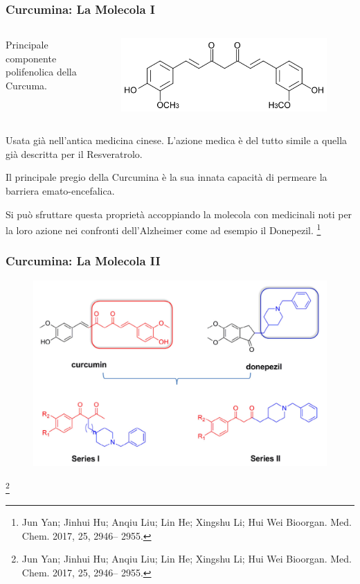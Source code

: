 \documentclass[9pt]{beamer}
\newcommand\blfootnote[1]{%
	\begingroup
	\renewcommand\thefootnote{}\footnote{#1}%
	\addtocounter{footnote}{-1}%
	\endgroup
}
\begin{document}
\begin{frame}
	\frametitle{Curcumina: La Molecola I}
	\begin{columns}
		\begin{column}{.4\textwidth}
			Principale componente polifenolica della Curcuma.
		\end{column}
		\begin{column}{.6\textwidth}
			\begin{figure}
				\includegraphics[width=.8\textwidth]{immagini/curcumina.png}
			\end{figure}
		\end{column}
	\end{columns}
	\bigskip

	Usata già nell'antica medicina cinese. L'azione medica è del tutto simile a quella già descritta per il Resveratrolo.

	Il principale pregio della Curcumina è la sua innata capacità di permeare la barriera emato-encefalica.

	Si può sfruttare questa proprietà accoppiando la molecola con medicinali noti per la loro azione nei confronti dell'Alzheimer come ad esempio il Donepezil.
	\blfootnote{Jun Yan; Jinhui Hu; Anqiu Liu; Lin He; Xingshu Li; Hui Wei Bioorgan. Med. Chem. 2017, 25, 2946–
		2955.}
\end{frame}

\begin{frame}
	\frametitle{Curcumina: La Molecola II}
	\begin{figure}
		\includegraphics[scale=0.9]{immagini/generale_curcdone.png}
	\end{figure}
	\blfootnote{Jun Yan; Jinhui Hu; Anqiu Liu; Lin He; Xingshu Li; Hui Wei Bioorgan. Med. Chem. 2017, 25, 2946–
		2955.}
\end{frame}
\end{document}
